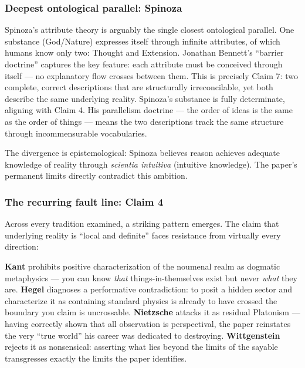 \documentclass[
]{article}
\begin{document}
\hypertarget{deepest-ontological-parallel-spinoza}{%
\subsubsection{Deepest ontological parallel:
Spinoza}\label{deepest-ontological-parallel-spinoza}}

Spinoza's attribute theory is arguably the single closest ontological
parallel. One substance (God/Nature) expresses itself through infinite
attributes, of which humans know only two: Thought and Extension.
Jonathan Bennett's ``barrier doctrine'' captures the key feature: each
attribute must be conceived through itself --- no explanatory flow
crosses between them. This is precisely Claim 7: two complete, correct
descriptions that are structurally irreconcilable, yet both describe the
same underlying reality. Spinoza's substance is fully determinate,
aligning with Claim 4. His parallelism doctrine --- the order of ideas
is the same as the order of things --- means the two descriptions track
the same structure through incommensurable vocabularies.

The divergence is epistemological: Spinoza believes reason achieves
adequate knowledge of reality through \emph{scientia intuitiva}
(intuitive knowledge). The paper's permanent limits directly contradict
this ambition.

\hypertarget{the-recurring-fault-line-claim-4}{%
\subsubsection{The recurring fault line: Claim
4}\label{the-recurring-fault-line-claim-4}}

Across every tradition examined, a striking pattern emerges. The claim
that underlying reality is ``local and definite'' faces resistance from
virtually every direction:

\textbf{Kant} prohibits positive characterization of the noumenal realm
as dogmatic metaphysics --- you can know \emph{that}
things-in-themselves exist but never \emph{what} they are.
\textbf{Hegel} diagnoses a performative contradiction: to posit a hidden
sector and characterize it as containing standard physics is already to
have crossed the boundary you claim is uncrossable. \textbf{Nietzsche}
attacks it as residual Platonism --- having correctly shown that all
observation is perspectival, the paper reinstates the very ``true
world'' his career was dedicated to destroying. \textbf{Wittgenstein}
rejects it as nonsensical: asserting what lies beyond the limits of the
sayable transgresses exactly the limits the paper identifies.
\end{document}
